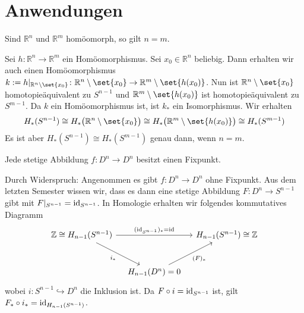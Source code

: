 \newpage

\section{Anwendungen} %
\label{sec:10}

\begin{satz}[{name={Invarianz der Dimension}}]
	Sind $\mathbb{R}^n$ und $\mathbb{R}^m$ homöomorph, so gilt $n=m$.
\end{satz}
\begin{beweis}
	Sei $h \colon \mathbb{R}^n \to \mathbb{R}^m$ ein Homöomorphismus. 
	Sei $x_0 \in \mathbb{R}^n$ beliebig. 
	Dann erhalten wir auch einen Homöomorphismus $k := h|_{\mathbb{R}^n\setminus \set{x_0}} \colon \mathbb{R}^n \setminus \set{x_0} \to \mathbb{R}^m  \setminus \set{h(x_0)}$. 
	Nun ist $\mathbb{R}^n \setminus \set{x_0}$ homotopieäquivalent zu $S^{n-1}$ und $\mathbb{R}^{m}\setminus\set{h(x_0)}$ ist homotopieäquivalent zu $S^{m-1}$. 
	Da $k$ ein Homöomorphismus ist, ist $k_*$ ein Isomorphismus. Wir erhalten
	\begin{align*}
		H_*(S^{n-1}) \cong H_* \enbrace[\big]{\mathbb{R}^n \setminus \set{x_0}}  \cong H_* \enbrace[\big]{\mathbb{R}^m \setminus \set{h(x_0)}} \cong H_*(S^{m-1})
	\end{align*}
	Es ist aber $H_*(S^{n-1}) \cong H_*(S^{m-1})$ genau dann, wenn $n=m$.
\end{beweis}

\begin{satz}[{name={Fixpunktsatz von Brouwer}}]
	Jede stetige Abbildung $f \colon D^n \to D^n$ besitzt einen Fixpunkt.
\end{satz}
\begin{beweis}
	Durch Widerspruch: Angenommen es gibt $f\colon D^n \to D^n$ ohne Fixpunkt. Aus dem letzten Semester wissen wir, dass es dann eine stetige Abbildung $F\colon D^n \to S^{n-1}$ 
	gibt mit $F|_{S^{n-1}} = \operatorname{id}_{S^{n-1}}$. In Homologie erhalten wir folgendes kommutatives Diagramm 
	\[
		\begin{tikzcd}[row sep=large, column sep=1em]
			\mathbb{Z}\cong H_{n-1}(S^{n-1}) \arrow[rr,"(\id_{S^{n-1}})_* = \id" ] \arrow[dr,"i_*"'] && H_{n-1}(S^{n-1}) \cong \mathbb{Z} \\
			& H_{n-1}(D^n)=0  \urar["(F)_*"']&
		\end{tikzcd}
	\]
	wobei $i\colon S^{n-1} \hookrightarrow D^n$ die Inklusion ist. Da $F \circ i = \operatorname{id}_{S^{n-1}}$ ist, gilt $F_* \circ i_* = \operatorname{id}_{H_{n-1}(S^{n-1})}$.
\end{beweis}

